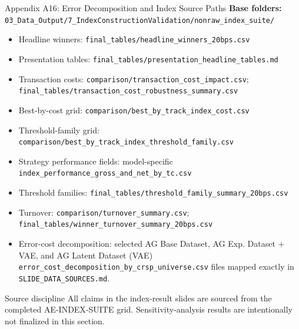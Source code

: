 \documentclass[10pt]{beamer}\usepackage[]{graphicx}\usepackage[table]{xcolor}
\begin{document}
\begin{frame}{Appendix A16: Error Decomposition and Index Source Paths}
\scriptsize
\textbf{Base folders:} \texttt{03\_Data\_Output/7\_IndexConstructionValidation/nonraw\_index\_suite/}\\
\vspace{0.25em}
\begin{itemize}
  \item Headline winners: \texttt{final\_tables/headline\_winners\_20bps.csv}
  \item Presentation tables: \texttt{final\_tables/presentation\_headline\_tables.md}
  \item Transaction costs: \texttt{comparison/transaction\_cost\_impact.csv}; \texttt{final\_tables/transaction\_cost\_robustness\_summary.csv}
  \item Best-by-cost grid: \texttt{comparison/best\_by\_track\_index\_cost.csv}
  \item Threshold-family grid: \texttt{comparison/best\_by\_track\_index\_threshold\_family.csv}
  \item Strategy performance fields: model-specific \texttt{index\_performance\_gross\_and\_net\_by\_tc.csv}
  \item Threshold families: \texttt{final\_tables/threshold\_family\_summary\_20bps.csv}
  \item Turnover: \texttt{comparison/turnover\_summary.csv}; \texttt{final\_tables/winner\_turnover\_summary\_20bps.csv}
  \item Error-cost decomposition: selected AG Base Dataset, AG Exp. Dataset + VAE, and AG Latent Dataset (VAE) \texttt{error\_cost\_decomposition\_by\_crsp\_universe.csv} files mapped exactly in \texttt{SLIDE\_DATA\_SOURCES.md}.
\end{itemize}
\vspace{0.3em}
\begin{block}{Source discipline}
\scriptsize
All claims in the index-result slides are sourced from the completed AE-INDEX-SUITE grid. Sensitivity-analysis results are intentionally not finalized in this section.
\end{block}
\end{frame}
\end{document}
